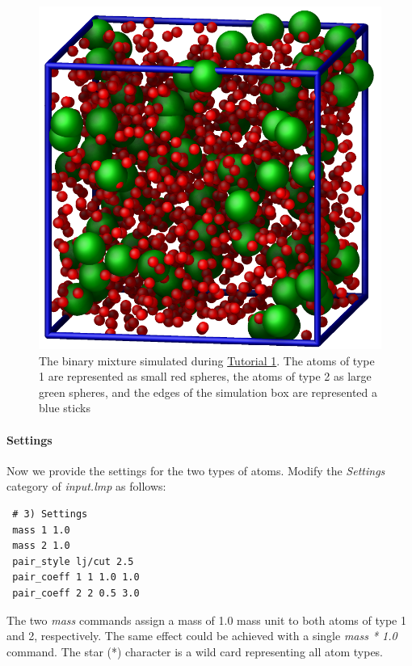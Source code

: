 \documentclass[9pt,tutorial]{livecoms}
\begin{document}
\begin{figure}
\centering
\includegraphics[width=0.55\linewidth]{LJ}
\caption{The binary mixture simulated during \hyperref[lennard-jones-label]{Tutorial 1}.
  The atoms of type 1 are represented as small red spheres, the atoms of type 2 as large
  green spheres, and the edges of the simulation box are represented a blue sticks}
\label{fig:LJ}
\end{figure}

\paragraph{Settings}
Now we provide the settings for the two types of atoms.  Modify the
\textit{Settings} category of \textit{input.lmp} as follows:
{\normalsize
\begin{verbatim}
 # 3) Settings
 mass 1 1.0
 mass 2 1.0
 pair_style lj/cut 2.5
 pair_coeff 1 1 1.0 1.0
 pair_coeff 2 2 0.5 3.0
\end{verbatim}
}

The two \textit{mass} commands assign a mass of 1.0 mass unit
to both atoms of type 1 and 2, respectively.  The same effect could be
achieved with a single \textit{mass * 1.0} command. The star (*) character
is a wild card representing all atom types.
\end{document}
